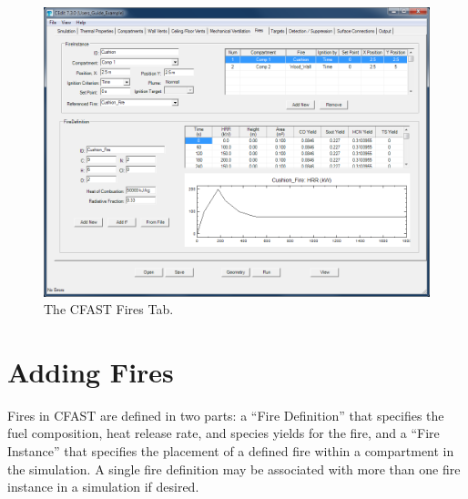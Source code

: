 \begin{figure}[h!]
\begin{center}
\includegraphics[width=6.5in]{FIGURES/Fire_Tab}
\caption[The CFAST Fires Tab]{The CFAST Fires Tab.}
\end{center}
\end{figure}


\section{Adding Fires}
\label{info:FIRE}
\label{sec:fire_inputs}
Fires in CFAST are defined in two parts: a ``Fire Definition'' that specifies the fuel composition, heat release rate, and species yields for the fire, and a ``Fire Instance'' that specifies the placement of a defined fire within a compartment in the simulation. A single fire definition may be associated with more than one fire instance in a simulation if desired.

